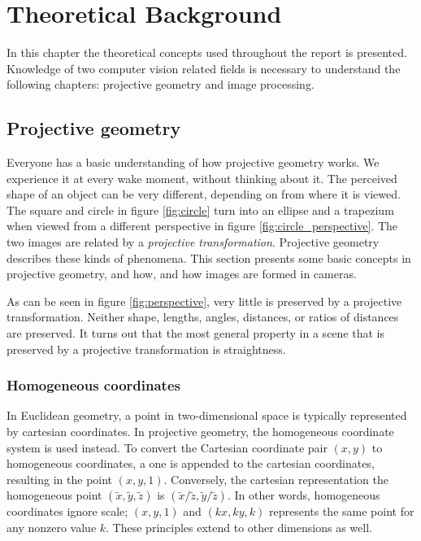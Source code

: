 \chapter{Theoretical Background} %
In this chapter the theoretical concepts used throughout the report is presented. Knowledge of two computer vision related fields is necessary to understand the following chapters: projective geometry and image processing.

\section{Projective geometry}
Everyone has a basic understanding of how projective geometry works.
We experience it at every wake moment, without thinking about it. 
The perceived shape of an object can be very different, depending on from where it is viewed.
The square and circle in figure \ref{fig:circle} turn into an ellipse and a trapezium when viewed from a different perspective in figure \ref{fig:circle_perspective}.
The two images are related by a \textit{projective transformation}.
Projective geometry describes these kinds of phenomena.
This section presents some basic concepts in projective geometry, and how, and how images are formed in cameras.



As can be seen in figure \ref{fig:perspective}, very little is preserved by a projective transformation.
Neither shape, lengths, angles, distances, or ratios of distances are preserved.
It turns out that the most general property in a scene that is preserved by a projective transformation is straightness. \cite[1]{hartley-zisserman}

\subsection{Homogeneous coordinates}

In Euclidean geometry, a point in two-dimensional space is typically represented by cartesian coordinates.
In projective geometry, the homogeneous coordinate system is used instead.
To convert the Cartesian coordinate pair $(x,y)$ to homogeneous coordinates, a one is appended to the cartesian coordinates, resulting in the point $(x,y,1)$. 
Conversely, the cartesian representation the homogeneous point $(\tilde{x},\tilde{y},\tilde{z})$ is $(\tilde{x}/\tilde{z},\tilde{y}/\tilde{z})$. 
In other words, homogeneous coordinates ignore scale; $(x,y,1)$ and $(kx,ky,k)$ represents the same point for any nonzero value $k$.
These principles extend to other dimensions as well. \cite[2]{hartley-zisserman}


